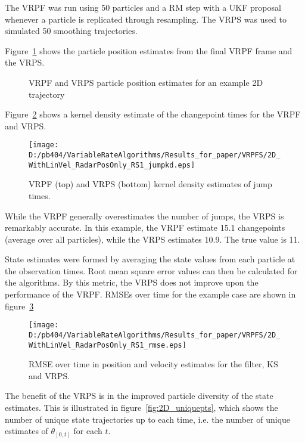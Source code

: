\documentclass[journal]{IEEEtran}
\begin{document}
The VRPF was run using 50 particles and a RM step with a UKF proposal whenever a particle is replicated through resampling. The VRPS was used to simulated 50 smoothing trajectories.

Figure~\ref{fig:2D_particles} shows the particle position estimates from the final VRPF frame and the VRPS.

\begin{figure}[hbt]
\caption{VRPF and VRPS particle position estimates for an example 2D trajectory}
\label{fig:2D_particles}
\end{figure}

Figure~\ref{fig:2D_jumpkd} shows a kernel density estimate of the changepoint times for the VRPF and VRPS.

\begin{figure}[hbt]
\centering \texttt{[image: D:/pb404/VariableRateAlgorithms/Results\_for\_paper/VRPFS/2D\_WithLinVel\_RadarPosOnly\_RS1\_jumpkd.eps]}
\caption{VRPF (top) and VRPS (bottom) kernel density estimates of jump times.}
\label{fig:2D_jumpkd}
\end{figure}

While the VRPF generally overestimates the number of jumps, the VRPS is remarkably accurate. In this example, the VRPF estimate 15.1 changepoints (average over all particles), while the VRPS estimates 10.9. The true value is 11.

State estimates were formed by averaging the state values from each particle at the observation times. Root mean square error values can then be calculated for the algorithms. By this metric, the VRPS does not improve upon the performance of the VRPF. RMSEs over time for the example case are shown in figure~\ref{fig:2D_rmse}

\begin{figure}[hbt]
\centering \texttt{[image: D:/pb404/VariableRateAlgorithms/Results\_for\_paper/VRPFS/2D\_WithLinVel\_RadarPosOnly\_RS1\_rmse.eps]}
\caption{RMSE over time in position and velocity estimates for the filter, KS and VRPS.}
\label{fig:2D_rmse}
\end{figure}

The benefit of the VRPS is in the improved particle diversity of the state estimates. This is illustrated in figure~\ref{fig:2D_uniquepts}, which shows the number of unique state trajectories up to each time, i.e. the number of unique estimates of $\theta_{[0,t]}$ for each $t$.
\end{document}
